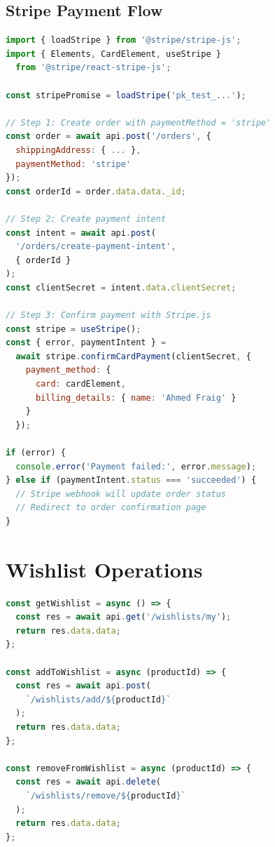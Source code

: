 \subsection{Stripe Payment Flow}

\begin{lstlisting}[language=JavaScript,title=Stripe Checkout Flow]
import { loadStripe } from '@stripe/stripe-js';
import { Elements, CardElement, useStripe }
  from '@stripe/react-stripe-js';

const stripePromise = loadStripe('pk_test_...');

// Step 1: Create order with paymentMethod = 'stripe'
const order = await api.post('/orders', {
  shippingAddress: { ... },
  paymentMethod: 'stripe'
});
const orderId = order.data.data._id;

// Step 2: Create payment intent
const intent = await api.post(
  '/orders/create-payment-intent',
  { orderId }
);
const clientSecret = intent.data.clientSecret;

// Step 3: Confirm payment with Stripe.js
const stripe = useStripe();
const { error, paymentIntent } =
  await stripe.confirmCardPayment(clientSecret, {
    payment_method: {
      card: cardElement,
      billing_details: { name: 'Ahmed Fraig' }
    }
  });

if (error) {
  console.error('Payment failed:', error.message);
} else if (paymentIntent.status === 'succeeded') {
  // Stripe webhook will update order status
  // Redirect to order confirmation page
}
\end{lstlisting}

\section{Wishlist Operations}

\begin{lstlisting}[language=JavaScript,title=Wishlist API Calls]
const getWishlist = async () => {
  const res = await api.get('/wishlists/my');
  return res.data.data;
};

const addToWishlist = async (productId) => {
  const res = await api.post(
    `/wishlists/add/${productId}`
  );
  return res.data.data;
};

const removeFromWishlist = async (productId) => {
  const res = await api.delete(
    `/wishlists/remove/${productId}`
  );
  return res.data.data;
};
\end{lstlisting}

